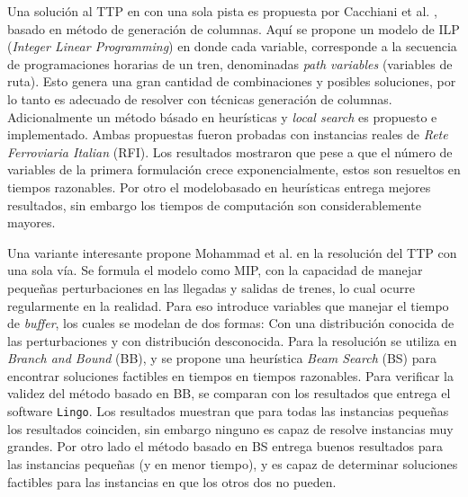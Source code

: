 \documentclass[letter, 10pt]{article}
\begin{document}
\begin{description}
	Una solución al TTP en con una sola pista es propuesta por Cacchiani et al. \cite{Cacchiani}, basado en método de generación de columnas. Aquí se propone un modelo de ILP (\textit{Integer Linear Programming}) en donde cada variable, corresponde a la secuencia de programaciones horarias de un tren, denominadas \textit{path variables} (variables de ruta). Esto genera una gran cantidad de combinaciones y posibles soluciones, por lo tanto es adecuado de resolver con técnicas generación de columnas. Adicionalmente un método básado en heurísticas y \textit{local search} es propuesto e implementado. Ambas propuestas fueron probadas con instancias reales de \textit{Rete Ferroviaria Italian} (RFI). Los resultados mostraron que pese a que el número de variables de la primera formulación crece exponencialmente, estos son resueltos en tiempos razonables. Por otro el modelobasado en heurísticas entrega mejores resultados, sin embargo los tiempos de computación son considerablemente mayores.

	Una variante interesante propone Mohammad et al. \cite{Mohammad} en la resolución del TTP con una sola vía. Se formula el modelo como MIP, con la capacidad de manejar pequeñas perturbaciones en las llegadas y salidas de trenes, lo cual ocurre regularmente en la realidad. Para eso introduce variables que manejar el tiempo de \textit{buffer}, los cuales se modelan de dos formas: Con una distribución conocida de las perturbaciones y con distribución desconocida. Para la resolución se utiliza en \textit{Branch and Bound} (BB), y se propone una heurística \textit{Beam Search} (BS) para encontrar soluciones factibles en tiempos en tiempos razonables. Para verificar la validez del método basado en BB, se comparan con los resultados que entrega el software \texttt{Lingo}. Los resultados muestran que para todas las instancias pequeñas los resultados coinciden, sin embargo ninguno es capaz de resolve instancias muy grandes. Por otro lado el método basado en BS entrega buenos resultados para las instancias pequeñas (y en menor tiempo), y es capaz de determinar soluciones factibles para las instancias en que los otros dos no pueden.  



\end{description}
\end{document}
